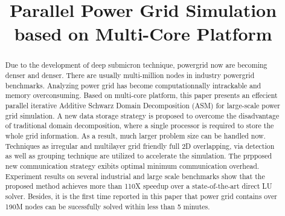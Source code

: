 \documentclass{sig-alternate}
\begin{document}
\title{Parallel Power Grid Simulation based on Multi-Core Platform}

\maketitle

\begin{abstract}
	Due to the development of deep submicron technique, powergrid now are becoming denser and denser. There are usually 
	multi-million nodes in industry powergrid benchmarks. Analyzing power grid has become computationnally 
	intrackable and memory overconsuming. Based on multi-core platform, this paper presents an effecient parallel iterative 
	Additive Schwarz Domain Decomposition (ASM) for large-scale power grid simulation. A new data storage strategy is proposed 
	to overcome
	the disadvantage of traditional domain decomposition, where a single processor is required to store the whole grid information.
	As a result, much larger problem size can be handled now. Techniques as irregular and multilayer grid friendly full 2D 
	overlapping, via detection as well as grouping technique are utilized to accelerate the simulation. The prpposed new
	communication strategy exibits optimal minimum communication overhead. Experiment results on several industrial and large 
	scale benchmarks show that the proposed method 
	achieves more than 110X speedup over a state-of-the-art direct LU solver. Besides, it is the first time 
	reported in this paper that power grid contains over 190M nodes can be sucessfully solved within less than 5 minutes.
\end{abstract}
\end{document}

